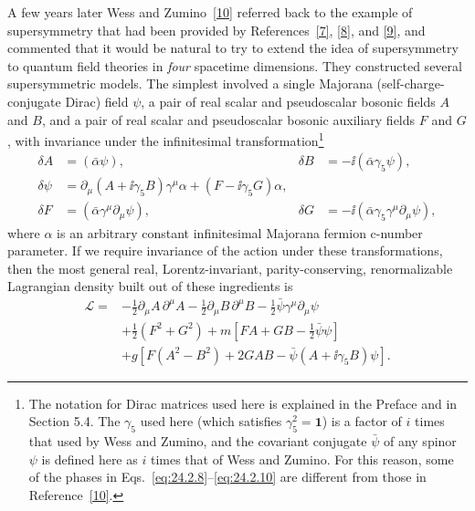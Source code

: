 A few years later Wess and Zumino~\hyperref[ch24-ref-10]{[10]} referred back
to the example of supersymmetry that had been provided by
References~\hyperref[ch24-ref-7]{[7]}, \hyperref[ch24-ref-8]{[8]}, and
\hyperref[ch24-ref-9]{[9]}, and commented that it would be natural to try to
extend the idea of supersymmetry to quantum field theories in \emph{four}
spacetime dimensions. They constructed several supersymmetric models. The
simplest involved a single Majorana (self-charge-conjugate Dirac) field
\(\psi\), a pair of real scalar and pseudoscalar bosonic fields \(A\) and
\(B\), and a pair of real scalar and pseudoscalar bosonic auxiliary fields
\(F\) and \(G\), with invariance under the infinitesimal
transformation\footnote{The notation for Dirac matrices used here is explained
in the Preface and in Section 5.4. The \(\gamma_5\) used here (which satisfies
\(\gamma_5^2=\mathbf{1}\)) is a factor of \(i\) times that used by Wess and Zumino, and
the covariant conjugate \(\bar\psi\) of any spinor \(\psi\) is defined here as
\(i\) times that of Wess and Zumino. For this reason, some of the phases in
Eqs.~\eqref{eq:24.2.8}--\eqref{eq:24.2.10} are different from those in
Reference~\hyperref[ch24-ref-10]{[10]}.}
\begin{equation}
\begin{aligned}
\delta A&=(\bar\alpha\psi),
&
\delta B&=-\ii(\bar\alpha\gamma_5\psi),
\\
\delta\psi
&=\partial_\mu(A+\ii\gamma_5B)\gamma^\mu\alpha
+(F-\ii\gamma_5G)\alpha,
\\
\delta F&=(\bar\alpha\gamma^\mu\partial_\mu\psi),
&
\delta G&=-\ii(\bar\alpha\gamma_5\gamma^\mu\partial_\mu\psi),
\end{aligned}
\tag{24.2.8}\label{eq:24.2.8}
\end{equation}
where \(\alpha\) is an arbitrary constant infinitesimal Majorana fermion
c-number parameter. If we require invariance of the action under these
transformations, then the most general real, Lorentz-invariant,
parity-conserving, renormalizable Lagrangian density built out of these
ingredients is
\begin{equation}
\begin{aligned}
\mathcal L={}&
-\frac12\partial_\mu A\,\partial^\mu A
-\frac12\partial_\mu B\,\partial^\mu B
-\frac12\bar\psi\gamma^\mu\partial_\mu\psi
\\
&+\frac12(F^2+G^2)
+m\left[FA+GB-\frac12\bar\psi\psi\right]
\\
&+g\left[
F(A^2-B^2)+2GAB-\bar\psi(A+\ii\gamma_5B)\psi
\right].
\end{aligned}
\tag{24.2.9}\label{eq:24.2.9}
\end{equation}
